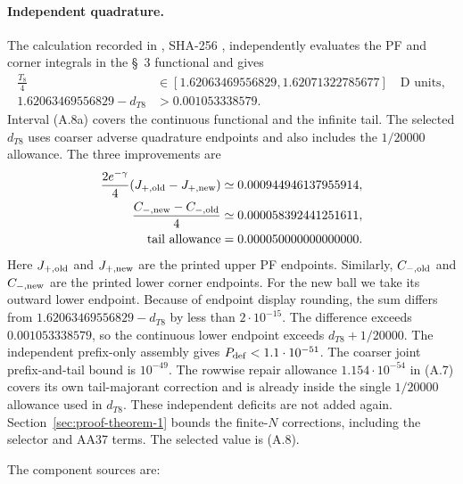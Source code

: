 {\paragraph{Independent quadrature.} The calculation recorded in
,
SHA-256
,
independently evaluates the PF and corner integrals in the \S~3 functional and gives
\[
\begin{aligned}
 \frac{T_8}{4}&\in
 [1.62063469556829,1.62071322785677]\quad\text{D units},\\
 1.62063469556829-d_{T8}&>0.001053338579.
\end{aligned}\tag{A.8a}
\]
Interval (A.8a) covers the continuous functional and the infinite tail.
The selected $d_{T8}$ uses coarser adverse quadrature endpoints
and also includes the $1/20000$ allowance.
The three improvements are
\[
\begin{aligned}
 \frac{2e^{-\gamma}}4(J_{+,\rm old}-J_{+,\rm new})
   &\simeq0.000944946137955914,\\
 \frac{C_{-,\rm new}-C_{-,\rm old}}4
   &\simeq0.000058392441251611,\\
 \text{tail allowance}&=0.000050000000000000.
\end{aligned}
\]
Here $J_{+,\rm old}$ and $J_{+,\rm new}$ are the printed upper PF
endpoints. Similarly, $C_{-,\rm old}$ and $C_{-,\rm new}$ are the
printed lower corner endpoints. For the new ball we take its outward lower
endpoint. Because of endpoint display rounding, the sum differs from
$1.62063469556829-d_{T8}$ by less than $2\cdot10^{-15}$.
The difference exceeds $0.001053338579$,
so the continuous lower endpoint exceeds $d_{T8}+1/20000$.
The independent prefix-only assembly gives $P_{\rm def}<1.1\cdot10^{-51}$.
The coarser joint prefix-and-tail bound is $10^{-49}$.
The rowwise repair allowance $1.154\cdot10^{-54}$ in (A.7) covers its
own tail-majorant correction and is already inside the single $1/20000$
allowance used in $d_{T8}$. These independent deficits are not added again.
Section~\ref{sec:proof-theorem-1} bounds the finite-$N$ corrections,
including the selector and AA37 terms.
The selected value is (A.8).

The component sources are:

}
